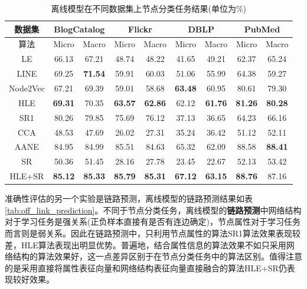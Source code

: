 \begin{table}[]
	\centering
	\caption{离线模型在不同数据集上节点分类任务结果(单位为\%)}
	\label{tab:static_node_classification}
	\begin{tabular}{|c||c|c||c|c||c|c||c|c|}
		\hline
		数据集      & \multicolumn{2}{c||}{BlogCatalog} & \multicolumn{2}{c||}{Flickr}     & \multicolumn{2}{c||}{DBLP}   & \multicolumn{2}{c|}{PubMed}     \\ \hline\hline
		算法       & Micro        & Macro       & Micro       & Macro       & Micro       & Macro       & Micro       & Macro       \\ \hline
		LE       & 66.13           & 67.21          & 48.74          & 48.22          & 41.65          & 49.21          & 62.37          & 65.24          \\ \hline
		LINE     & 69.25           & \textbf{71.54} & 59.91          & 60.03          & 51.06          & 55.99          & 64.38          & 59.27          \\ \hline
		Node2Vec & 67.21           & 69.39          & 59.01          & 58.68          & \textbf{63.48}          & 60.95 & 80.61          & 79.30          \\ \hline
		HLE      & \textbf{69.31}  & 70.35          & \textbf{63.57} & \textbf{62.86} & 62.12 & \textbf{61.76}          & \textbf{81.26} & \textbf{80.28} \\ \hline\hline
		SR1      & 80.26           & 79.85          & 75.69          & 76.12          & 37.13          & 36.65          & 64.23          & 66.16          \\ \hline\hline
		CCA      & 48.53           & 47.69          & 26.02          & 27.31          & 35.24          & 36.42          & 51.12          & 52.11          \\ \hline
		AANE     & 84.95           & 84.99          & 85.51          & 84.63 & 65.32          & 62.09          & 88.58          & \textbf{88.41} \\ \hline
		SR       & 50.36           & 51.45          & 28.16          & 27.78          & 23.45          & 22.67          & 52.13          & 53.42          \\ \hline
		HLE+SR   & \textbf{85.12}  & \textbf{85.33} & \textbf{85.79} & \textbf{85.31}          & \textbf{67.12} & \textbf{63.15} & \textbf{88.76} & 87.16          \\ \hline
	\end{tabular}
\end{table}

准确性评估的另一个实验是链路预测，离线模型的链路预测结果如表\ref{tab:off_link_prediction}。不同于节点分类任务，离线模型的\textbf{链路预测}中网络结构对于学习任务是强关系(正负样本直接有是否有连边确定)，节点属性对于学习任务而言则是弱关系。因此在链路预测中，只利用节点属性的算法SR1算法效果表现较差，HLE算法表现出明显优势。普遍地，结合属性信息的算法效果不如只采用网络结构的算法效果好，这一点差异区别于在节点分类任务中的算法区别。值得注意的是采用直接将属性表征向量和网络结构表征向量直接融合的算法HLE+SR仍表现较好效果。

